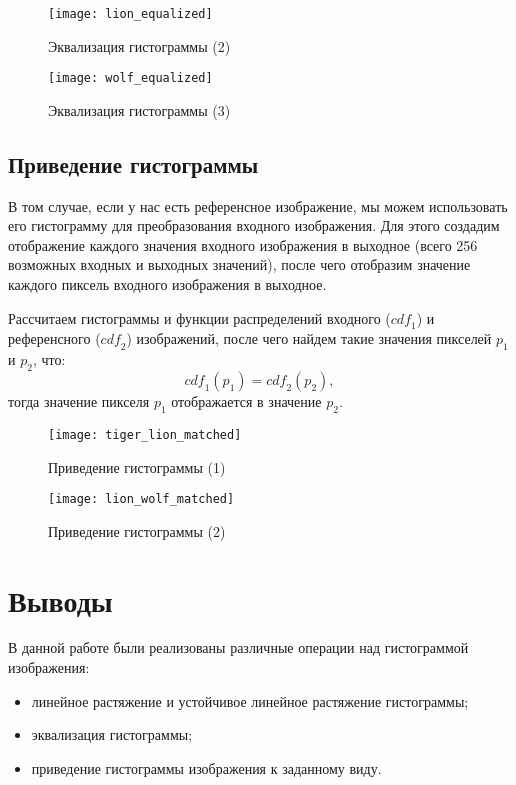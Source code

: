 \begin{figure}[H]
	\centering
	\texttt{[image: lion\_equalized]}
	\caption{Эквализация гистограммы (2)}
\end{figure}

\begin{figure}[H]
	\centering
	\texttt{[image: wolf\_equalized]}
	\caption{Эквализация гистограммы (3)}
\end{figure}

\subsection{Приведение гистограммы}

В том случае, если у нас есть референсное изображение, мы можем использовать его гистограмму для преобразования входного изображения. Для этого создадим отображение каждого значения входного изображения в выходное (всего 256 возможных входных и выходных значений), после чего отобразим значение каждого пиксель входного изображения в выходное. 

Рассчитаем гистограммы и функции распределений входного ($\mathit{cdf_1}$) и референсного ($\mathit{cdf_2}$) изображений, после чего найдем такие значения пикселей $p_1$ и $p_2$, что:
$$
\mathit{cdf_1}(p_1) = \mathit{cdf_2}(p_2),
$$
тогда значение пикселя $p_1$ отображается в значение $p_2$.

\begin{figure}[H]
	\centering
	\texttt{[image: tiger\_lion\_matched]}
	\caption{Приведение гистограммы (1)}
\end{figure}

\begin{figure}[H]
	\centering
	\texttt{[image: lion\_wolf\_matched]}
	\caption{Приведение гистограммы (2)}
\end{figure}

\section{Выводы}

В данной работе были реализованы различные операции над гистограммой изображения:

\begin{itemize}
	\item линейное растяжение и устойчивое линейное растяжение гистограммы;
	\item эквализация гистограммы;
	\item приведение гистограммы изображения к заданному виду.
\end{itemize}

